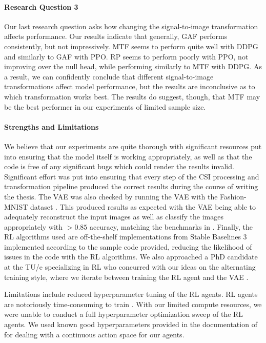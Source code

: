 \paragraph{Research Question 3}
Our last research question asks how changing the signal-to-image transformation affects performance.
Our results indicate that generally, GAF performs consistently, but not impressively.
MTF seems to perform quite well with DDPG and similarly to GAF with PPO.
RP seems to perform poorly with PPO, not improving over the null head, while performing similarly to MTF with DDPG.
As a result, we can confidently conclude that different signal-to-image transformations affect model performance, but the results are inconclusive as to which transformation works best.
The results do suggest, though, that MTF may be the best performer in our experiments of limited sample size.

\paragraph{Strengths and Limitations}
We believe that our experiments are quite thorough with significant resources put into ensuring that the model itself is working appropriately, as well as that the code is free of any significant bugs which could render the results invalid.
Significant effort was put into ensuring that every step of the CSI processing and transformation pipeline produced the correct results during the course of writing the thesis.
The VAE was also checked by running the VAE with the Fashion-MNIST dataset \cite{xiao2017fashion}.
This produced results as expected with the VAE being able to adequately reconstruct the input images as well as classify the images appropriately with $>0.85$ accuracy, matching the benchmarks in \cite{xiao2017fashion}.
Finally, the RL algorithms used are off-the-shelf implementations from Stable Baselines 3 \cite{raffin2021stable} implemented according to the sample code provided, reducing the likelihood of issues in the code with the RL algorithms.
We also approached a PhD candidate at the TU/e specializing in RL who concurred with our ideas on the alternating training style, where we iterate between training the RL agent and the VAE \cite{grooten2023interview}.

Limitations include reduced hyperparameter tuning of the RL agents.
RL agents are notoriously time-consuming to train \cite{schulman2017proximal,schulman2017trust,lillicrap2015continuous}.
With our limited compute resources, we were unable to conduct a full hyperparameter optimization sweep of the RL agents.
We used known good hyperparameters provided in the documentation of \cite{raffin2021stable} for dealing with a continuous action space for our agents.

